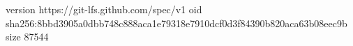 version https://git-lfs.github.com/spec/v1
oid sha256:8bbd3905a0dbb748c888aca1e79318e7910dcf0d3f84390b820aca63b08eec9b
size 87544
